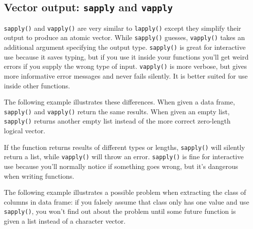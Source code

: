 \subsection{Vector output: \texttt{sapply} and \texttt{vapply}}

\texttt{sapply()} and \texttt{vapply()} are very similar to
\texttt{lapply()} except they simplify their output to produce an atomic
vector. While \texttt{sapply()} guesses, \texttt{vapply()} takes an
additional argument specifying the output type. \texttt{sapply()} is
great for interactive use because it saves typing, but if you use it
inside your functions you'll get weird errors if you supply the wrong
type of input. \texttt{vapply()} is more verbose, but gives more
informative error messages and never fails silently. It is better suited
for use inside other functions.  

The following example illustrates these differences. When given a data
frame, \texttt{sapply()} and \texttt{vapply()} return the same results.
When given an empty list, \texttt{sapply()} returns another empty list
instead of the more correct zero-length logical vector.

\begin{Shaded}
\begin{Highlighting}[]
\NormalTok{(}\NormalTok{))}
\NormalTok{(}
\NormalTok{(}\NormalTok{(}\NormalTok{))}
\end{Highlighting}
\end{Shaded}

If the function returns results of different types or lengths,
\texttt{sapply()} will silently return a list, while \texttt{vapply()}
will throw an error. \texttt{sapply()} is fine for interactive use
because you'll normally notice if something goes wrong, but it's
dangerous when writing functions.

The following example illustrates a possible problem when extracting the
class of columns in data frame: if you falsely assume that class only
has one value and use \texttt{sapply()}, you won't find out about the
problem until some future function is given a list instead of a
character vector.


